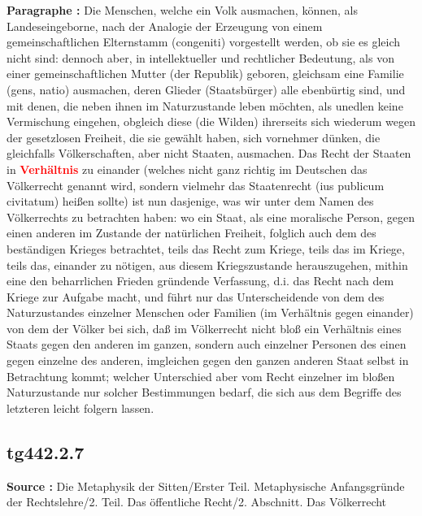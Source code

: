 \documentclass[a4paper,12pt,twoside]{book}
\newcommand{\match}[1]{\textcolor{red}{\textbf{#1}}}
\begin{document}
	\textbf{Paragraphe : }Die Menschen, welche ein Volk ausmachen, können, als Landeseingeborne, nach der Analogie der Erzeugung von einem gemeinschaftlichen Elternstamm (congeniti) vorgestellt werden, ob sie es gleich nicht sind: dennoch aber, in intellektueller und rechtlicher Bedeutung, als von einer gemeinschaftlichen Mutter (der Republik) geboren, gleichsam eine Familie (gens, natio) ausmachen, deren Glieder (Staatsbürger) alle ebenbürtig sind, und mit denen, die neben ihnen im Naturzustande leben möchten, als unedlen keine Vermischung eingehen, obgleich diese (die Wilden) ihrerseits sich wiederum wegen der gesetzlosen Freiheit, die sie gewählt haben, sich vornehmer dünken, die gleichfalls Völkerschaften, aber nicht Staaten, ausmachen. Das Recht der Staaten in \match{Verhältnis} zu einander (welches nicht ganz richtig im Deutschen das Völkerrecht genannt wird, sondern vielmehr das Staatenrecht (ius publicum civitatum) heißen sollte) ist nun dasjenige, was wir unter dem Namen des Völkerrechts zu betrachten haben: wo ein Staat, als eine moralische Person, gegen einen anderen im Zustande der natürlichen Freiheit, folglich auch dem des beständigen Krieges betrachtet, teils das Recht zum Kriege, teils das im Kriege, teils das, einander zu nötigen, aus diesem Kriegszustande herauszugehen, mithin eine den beharrlichen Frieden gründende Verfassung, d.i. das Recht nach dem Kriege zur Aufgabe macht, und führt nur das Unterscheidende von dem des Naturzustandes einzelner Menschen oder Familien (im Verhältnis gegen einander) von dem der Völker bei sich, daß im Völkerrecht nicht bloß ein Verhältnis eines Staats gegen den anderen im ganzen, sondern auch einzelner Personen des einen gegen einzelne des anderen, imgleichen gegen den ganzen anderen Staat selbst in Betrachtung kommt; welcher Unterschied aber vom Recht einzelner im  bloßen Naturzustande nur solcher Bestimmungen bedarf, die sich aus dem Begriffe des letzteren leicht folgern lassen. 
	
	\subsection*{tg442.2.7} 
	\textbf{Source : }Die Metaphysik der Sitten/Erster Teil. Metaphysische Anfangsgründe der Rechtslehre/2. Teil. Das öffentliche Recht/2. Abschnitt. Das Völkerrecht\\  
	
\end{document}
